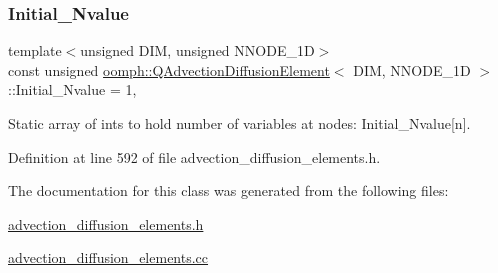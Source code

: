 \subsubsection{\texorpdfstring{Initial\+\_\+\+Nvalue}{Initial\_Nvalue}}
{\footnotesize\ttfamily template$<$unsigned D\+IM, unsigned N\+N\+O\+D\+E\+\_\+1D$>$ \\
const unsigned \hyperlink{classoomph_1_1QAdvectionDiffusionElement}{oomph\+::\+Q\+Advection\+Diffusion\+Element}$<$ D\+IM, N\+N\+O\+D\+E\+\_\+1D $>$\+::Initial\+\_\+\+Nvalue = 1\hspace{0.3cm}{\ttfamily [static]}, {\ttfamily [private]}}



Static array of ints to hold number of variables at nodes\+: Initial\+\_\+\+Nvalue\mbox{[}n\mbox{]}. 



Definition at line 592 of file advection\+\_\+diffusion\+\_\+elements.\+h.



The documentation for this class was generated from the following files\+:\begin{DoxyCompactItemize}
\item 
\hyperlink{advection__diffusion__elements_8h}{advection\+\_\+diffusion\+\_\+elements.\+h}\item 
\hyperlink{advection__diffusion__elements_8cc}{advection\+\_\+diffusion\+\_\+elements.\+cc}\end{DoxyCompactItemize}

